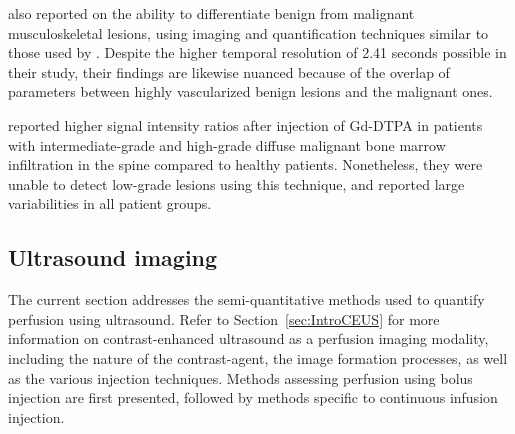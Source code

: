 \citet{Verstraete:1994iw} also reported on the ability to differentiate benign from malignant musculoskeletal lesions, using imaging and quantification techniques similar to those used by \citet{Erlemann:1989ib}.
Despite the higher temporal resolution of 2.41 seconds possible in their study, their findings are likewise nuanced because of the overlap of parameters between highly vascularized benign lesions and the malignant ones. %

\citet{Baur:1997ur} reported higher signal intensity ratios after injection of Gd-DTPA in patients with intermediate-grade and high-grade diffuse malignant bone marrow infiltration in the spine compared to healthy patients.
Nonetheless, they were unable to detect low-grade lesions using this technique, and reported large variabilities in all patient groups. %

\subsection{Ultrasound imaging}
\label{sec:SQCEUS}
The current section addresses the semi-quantitative methods used to quantify perfusion using ultrasound.
Refer to Section~\ref{sec:IntroCEUS} for more information on contrast-enhanced ultrasound as a perfusion imaging modality, including the nature of the contrast-agent, the image formation processes, as well as the various injection techniques.
Methods assessing perfusion using bolus injection are first presented, followed by methods specific to continuous infusion injection.


